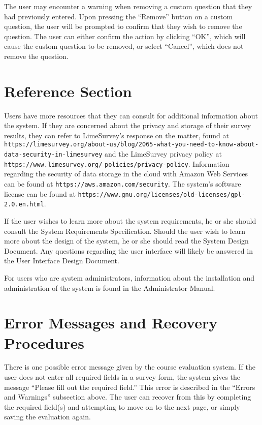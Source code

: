 \documentclass{article}
\begin{document}
The user may encounter a warning when removing a custom question that they had previously entered. Upon pressing the ``Remove'' button on a custom question, the user will be prompted to confirm that they wish to remove the question. The user can either confirm the action by clicking ``OK'', which will cause the custom question to be removed, or select ``Cancel'', which does not remove the question.

\section{Reference Section}

Users have more resources that they can consult for additional information about the system. If they are concerned about the privacy and storage of their survey results, they can refer to LimeSurvey's response on the matter, found at \verb|https://limesurvey.org/about-us/blog/2065-what-you-need-to-know-about-| \verb|data-security-in-limesurvey| and the LimeSurvey privacy policy at \verb|https://www.limesurvey.org/| \verb|policies/privacy-policy|. Information regarding the security of data storage in the cloud with Amazon Web Services can be found at \verb|https://aws.amazon.com/security|. The system's software license can be found at \verb|https://www.gnu.org/licenses/old-licenses/gpl-2.0.en.html|.

If the user wishes to learn more about the system requirements, he or she should consult the System Requirements Specification. Should the user wish to learn more about the design of the system, he or she should read the System Design Document. Any questions regarding the user interface will likely be answered in the User Interface Design Document. 

For users who are system administrators, information about the installation and administration of the system is found in the Administrator Manual. 

\section{Error Messages and Recovery Procedures}

There is one possible error message given by the course evaluation system. If the user does not enter all required fields in a survey form, the system gives the message ``Please fill out the required field.'' This error is described in the ``Errors and Warnings'' subsection above. The user can recover from this by completing the required field(s) and attempting to move on to the next page, or simply saving the evaluation again.
\end{document}

